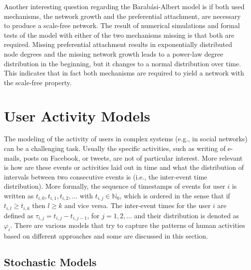 Another interesting question regarding the Barabási-Albert model is if both used mechanisms, the network growth and the preferential attachment, are necessary to produce a scale-free network.
The result of numerical simulations and formal tests of the model with either of the two mechanisms missing is that both are required.
Missing preferential attachment results in exponentially distributed node degrees and the missing network growth leads to a power-law degree distribution in the beginning, but it changes to a normal distribution over time.
This indicates that in fact both mechanisms are required to yield a network with the scale-free property.




\section{User Activity Models}
\label{sec:user-activity-models}

The modeling of the activity of users in complex systems (e.g., in social networks) can be a challenging task.
Usually the specific activities, such as writing of e-mails, posts on  Facebook, or tweets, are not of particular interest.
More relevant is how are these events or activities laid out in time and what  the distribution of intervals between two consecutive events is (i.e., the inter-event time distribution).
More formally, the sequence of timestamps of events for user \( i \) is written as \(t_{i,0}, t_{i,1}, t_{i,2}, \ldots \) with \( t_{i,j} \in \mathbb{N}_0 \), which is ordered in the sense that if \( t_{i,l} \ge  t_{i,k} \) then \( l \ge k \) and vice versa.
The inter-event times for the user \( i \) are defined as \( \tau_{i,j} = t_{i,j} - t_{i,j-1} \), for \(j = 1, 2, \ldots \) and their distribution is denoted as \( \varphi_{i} \).
There are various models that try to capture the patterns of human activities based on different approaches and some are discussed in this section.

\subsection{Stochastic Models}

